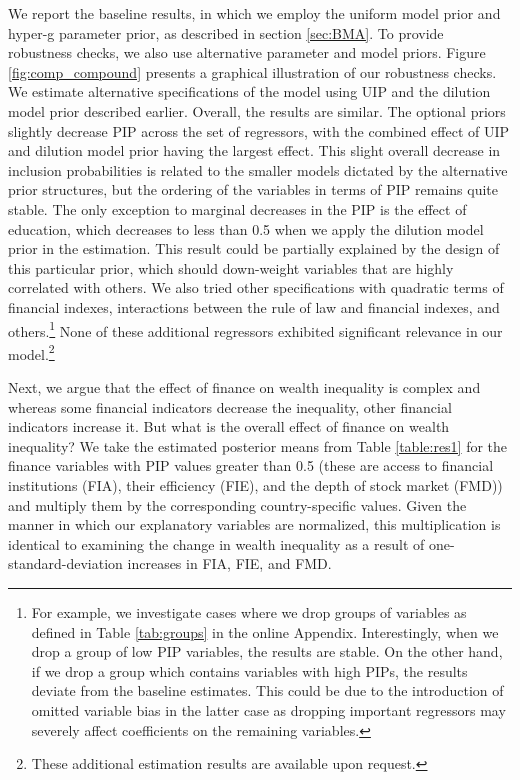 \documentclass[a4paper,11pt]{article}
\begin{document}
We report the baseline results, in which we employ the uniform model prior and hyper-g parameter prior, as described in section \ref{sec:BMA}. To provide robustness checks, we also use alternative parameter and model priors. Figure \ref{fig:comp_compound} presents a graphical illustration of our robustness checks. We estimate alternative specifications of the model using \ac{UIP} and the dilution model prior described earlier. Overall, the results are similar. The optional priors slightly decrease \ac{PIP} across the set of regressors, with the combined effect of \ac{UIP} and dilution model prior having the largest effect. This slight overall decrease in inclusion probabilities is related to the smaller models dictated by the alternative prior structures, but the ordering of the variables in terms of \ac{PIP} remains quite stable. The only exception to marginal decreases in the \ac{PIP} is the effect of education, which decreases to less than 0.5 when we apply the dilution model prior in the estimation. This result could be partially explained by the design of this particular prior, which should down-weight variables that are highly correlated with others. We also tried other specifications with quadratic terms of financial indexes, interactions between the rule of law and financial indexes, and others.\footnote{For example, we investigate cases where we drop groups of variables as defined in Table \ref{tab:groups} in the online Appendix. Interestingly, when we drop a group of low \ac{PIP} variables, the results are stable. On the other hand, if we drop a group which contains variables with high \ac{PIP}s, the results deviate from the baseline estimates. This could be due to the introduction of omitted variable bias in the latter case as dropping important regressors may severely affect coefficients on the remaining variables.} None of these additional regressors exhibited significant relevance in our model.\footnote{These additional estimation results are available upon request.}

Next, we argue that the effect of finance on wealth inequality is complex and whereas some financial indicators decrease the inequality, other financial indicators increase it. But what is the overall effect of finance on wealth inequality? We take the estimated posterior means from Table \ref{table:res1} for the finance variables with PIP values greater than 0.5 (these are access to financial institutions (FIA), their efficiency (FIE), and the depth of stock market (FMD)) and multiply them by the corresponding country-specific values. Given the manner in which our explanatory variables are normalized, this multiplication is identical to examining the change in wealth inequality as a result of one-standard-deviation increases in FIA, FIE, and FMD. 
\end{document}
